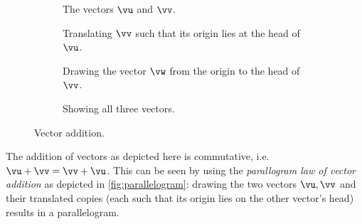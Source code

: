 \renewcommand\thesubfigure{\arabic{subfigure}}
\begin{figure}[h]
	\centering
	 \begin{subfigure}[t]{0.45\textwidth}
		\centering
		\caption{The vectors $\vu$ and $\vv$.}
	\end{subfigure}
	\hfill
	\begin{subfigure}[t]{0.45\textwidth}
		\centering
		\caption{Translating $\vv$ such that its origin lies at the head of $\vu$.}
	\end{subfigure}

	\vspace{3em}
	\begin{subfigure}[t]{0.45\textwidth}
		\centering
		\caption{Drawing the vector $\vw$ from the origin to the head of $\vv$.}
	\end{subfigure}
	\hfill
	\begin{subfigure}[t]{0.45\textwidth}
		\centering
		\caption{Showing all three vectors.}
	\end{subfigure}
	\caption{Vector addition.}
	\label{fig:vector addition geometric}
\end{figure}

The addition of vectors as depicted here is commutative, i.e. $\vu+\vv = \vv+\vu$. This can be seen by using the \emph{parallogram law of vector addition} as depicted in \autoref{fig:parallelogram}: drawing the two vectors $\vu, \vv$ and their translated copies (each such that its origin lies on the other vector's head) results in a parallelogram.

